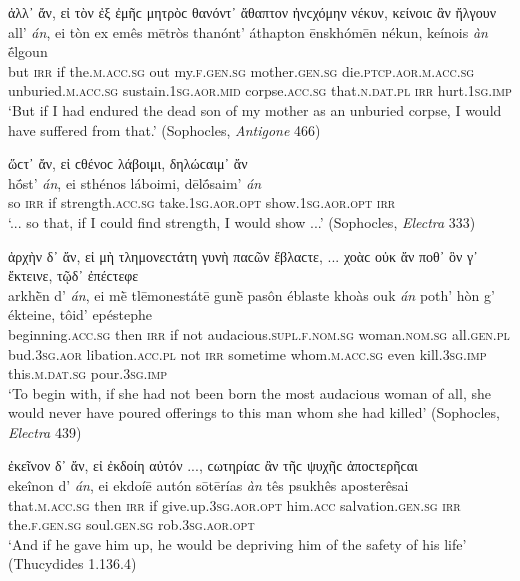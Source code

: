 \begin{exe}
\ex ἀλλ᾽ ἄν, εἰ τὸν ἐξ ἐμῆϲ μητρὸϲ θανόντ᾽ ἄθαπτον ἠνϲχόμην νέκυν, κείνοιϲ ἂν ἤλγουν\\
\gll all' \emph{án}, ei tòn ex emês mētròs thanónt' áthapton ēnskhómēn nékun, keínois \emph{àn} ḗlgoun\\
but \textsc{irr} if the.\textsc{m.acc.sg} out my.\textsc{f.gen.sg} mother.\textsc{gen.sg} die.\textsc{ptcp.aor.m.acc.sg} unburied.\textsc{m.acc.sg} sustain.\textsc{1sg.aor.mid} corpse.\textsc{acc.sg} that.\textsc{n.dat.pl} \textsc{irr} hurt.\textsc{1sg.imp}\\
\trans `But if I had endured the dead son of my mother as an unburied corpse, I would have suffered from that.' (Sophocles, \textit{Antigone} 466)
\label{anrepeat2}
\end{exe}

\begin{exe}
\ex ὥϲτ᾽ ἄν, εἰ ϲθένοϲ λάβοιμι, δηλώϲαιμ᾽ ἄν\\
\gll hṓst' \emph{án}, ei sthénos láboimi, dēlṓsaim' \emph{án}\\
so \textsc{irr} if strength.\textsc{acc.sg} take.\textsc{1sg.aor.opt} show.\textsc{1sg.aor.opt} \textsc{irr}\\
\trans `... so that, if I could find strength, I would show ...' (Sophocles, \textit{Electra} 333)
\label{anrepeat3}
\end{exe}

\begin{exe}
\ex ἀρχὴν δ᾽ ἄν, εἰ μὴ τλημονεϲτάτη γυνὴ παϲῶν ἔβλαϲτε, ... χοὰϲ οὐκ ἄν ποθ᾽ ὃν γ᾽ ἔκτεινε, τῷδ᾽ ἐπέϲτεφε\\
\gll arkhḕn d' \emph{án}, ei mḕ tlēmonestátē gunḕ pasôn éblaste khoàs ouk \emph{án} poth' hòn g' ékteine, tôid' epéstephe\\
beginning.\textsc{acc.sg} then \textsc{irr} if not audacious.\textsc{supl.f.nom.sg} woman.\textsc{nom.sg} all.\textsc{gen.pl} bud.\textsc{3sg.aor} libation.\textsc{acc.pl} not \textsc{irr} sometime whom.\textsc{m.acc.sg} even kill.\textsc{3sg.imp} this.\textsc{m.dat.sg} pour.\textsc{3sg.imp}\\
\trans `To begin with, if she had not been born the most audacious woman of all, she would never have poured offerings to this man whom she had killed' (Sophocles, \textit{Electra} 439)
\label{anrepeat4}
\end{exe}

\begin{exe}
\ex ἐκεῖνον δ᾽ ἄν, εἰ ἐκδοίη αὐτόν ..., ϲωτηρίαϲ ἂν τῆϲ ψυχῆϲ ἀποϲτερῆϲαι\\
\gll ekeînon d' \emph{án}, ei ekdoíē autón sōtērías \emph{àn} tês psukhês aposterêsai\\
that.\textsc{m.acc.sg} then \textsc{irr} if give.up.\textsc{3sg.aor.opt} him.\textsc{acc} salvation.\textsc{gen.sg} \textsc{irr} the.\textsc{f.gen.sg} soul.\textsc{gen.sg} rob.\textsc{3sg.aor.opt}\\
\trans `And if he gave him up, he would be depriving him of the safety of his life' (Thucydides 1.136.4)
\label{anrepeat5}
\end{exe}

